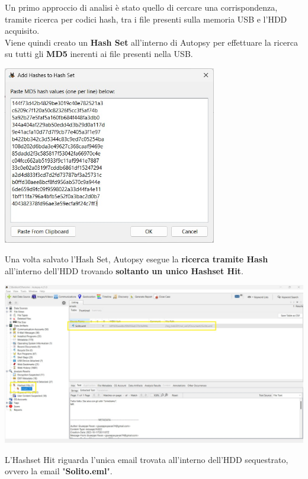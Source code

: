 Un primo approccio di analisi è stato quello di cercare una corrispondenza, tramite ricerca per codici hash, tra i file presenti sulla memoria USB e l'HDD acquisito.\vspace{14pt}\\
Viene quindi creato un \textbf{Hash Set} all'interno di Autopsy per effettuare la ricerca su tutti gli \textbf{MD5} inerenti ai file presenti nella USB.
\begin{center}
    \includegraphics[width=0.7\textwidth]{img/hash-list.jpeg}
\end{center}
Una volta salvato l'Hash Set, Autopsy esegue la \textbf{ricerca tramite Hash} all'interno dell'HDD trovando \textbf{soltanto un unico Hashset Hit}.
\begin{center}
    \includegraphics[width=1\textwidth]{img/hash-result.jpeg}
\end{center}
L'Hashset Hit riguarda l'unica email trovata all'interno dell'HDD sequestrato, ovvero la email "\textbf{Solito.eml}".